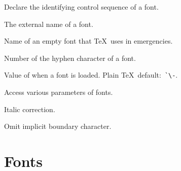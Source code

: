 \begin{inventory}
\item [\cs{font}] 
      Declare the identifying control sequence of a font.

\item [\cs{fontname}] 
      The external name of a font.

\item [\cs{nullfont}] 
      Name of an empty font that \TeX\ uses in emergencies.


\item [\cs{hyphenchar}] 
      Number of the hyphen character of a font.

\item [\cs{defaulthyphenchar}] 
      Value of  when a font is loaded.
      Plain \TeX\ default:~\verb>`\->.

\item [\cs{fontdimen}] 
      Access various parameters of fonts.

\item [\cs{char47}]
      Italic correction.

\item [\cs{noboundary}] 
      Omit implicit boundary character.
\end{inventory}

\section{Fonts}

